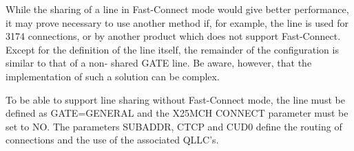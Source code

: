 \documentclass[letterpaper,10pt,english]{sphinxmanual}
\begin{document}
While the sharing of a line in Fast-Connect mode would give better performance, it may prove necessary to use another method if, for example, the line is used for 3174 connections, or by another product which does not support Fast-Connect. Except for the definition of the line itself, the remainder of the configuration is similar to that of a non- shared GATE line. Be aware, however, that the implementation of such a solution can be complex.

To be able to support line sharing without Fast-Connect mode, the line must be defined as GATE=GENERAL and the X25MCH CONNECT parameter must be set to NO. The parameters SUBADDR, CTCP and CUD0 define the routing of connections and the use of the associated QLLC’s.

\begin{sphinxVerbatim}[commandchars=\\\{\}]
                                               
                                                 
                  
                                                 
                                                     
                                                      
                                                       
                                                  
                         
                                     
                                                  
          

\end{sphinxVerbatim}
\end{document}
